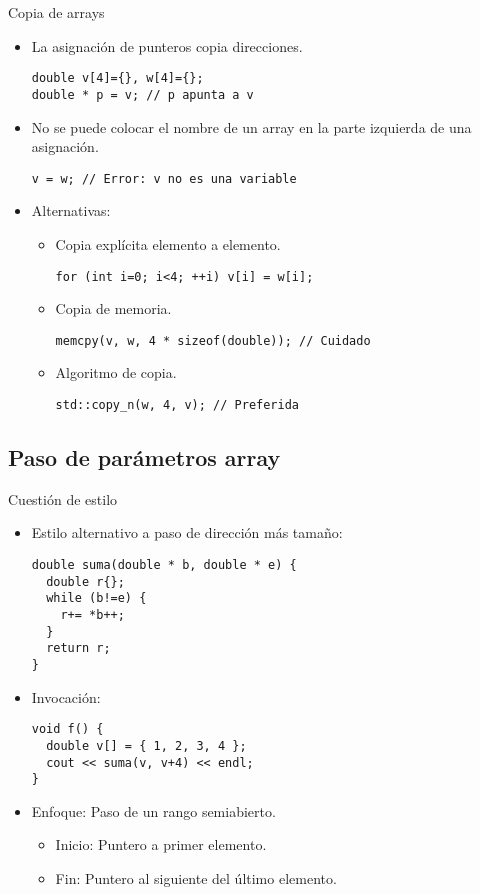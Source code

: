 \begin{frame}[fragile]{Copia de arrays}
\begin{itemize}
  \item La asignación de punteros copia direcciones.
\begin{lstlisting}
double v[4]={}, w[4]={};
double * p = v; // p apunta a v
\end{lstlisting}
  \item No se puede colocar el nombre de un array en la parte izquierda de una asignación.
\begin{lstlisting}
v = w; // Error: v no es una variable
\end{lstlisting}
  \item Alternativas:
    \begin{itemize}
      \item Copia explícita elemento a elemento.
\begin{lstlisting}
for (int i=0; i<4; ++i) v[i] = w[i];
\end{lstlisting}
      \item Copia de memoria.
\begin{lstlisting}
memcpy(v, w, 4 * sizeof(double)); // Cuidado
\end{lstlisting}
      \item Algoritmo de copia.
\begin{lstlisting}
std::copy_n(w, 4, v); // Preferida
\end{lstlisting}
    \end{itemize}
\end{itemize}
\end{frame}

\subsection{Paso de parámetros array}

\begin{frame}[fragile]{Cuestión de estilo}
\begin{itemize}
  \item Estilo alternativo a paso de dirección más tamaño:
\begin{lstlisting}
double suma(double * b, double * e) {
  double r{};
  while (b!=e) {
    r+= *b++;
  }
  return r;
}
\end{lstlisting}
  \item Invocación:
\begin{lstlisting}
void f() {
  double v[] = { 1, 2, 3, 4 };
  cout << suma(v, v+4) << endl;
}
\end{lstlisting}
  \item Enfoque: Paso de un rango semiabierto.
    \begin{itemize}
      \item Inicio: Puntero a primer elemento.
      \item Fin: Puntero al siguiente del último elemento.
    \end{itemize}
\end{itemize}
\end{frame}

